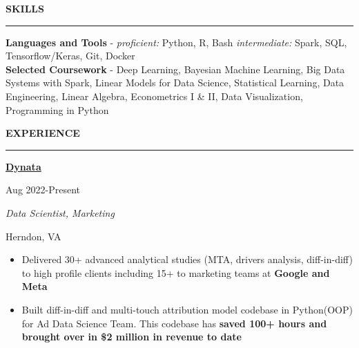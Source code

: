 \documentclass[
  16,
]{article}
\providecommand{\tightlist}{%
  \setlength{\itemsep}{0pt}\setlength{\parskip}{0pt}}\usepackage{longtable,booktabs,array}
\begin{document}
\begin{large}{\bf SKILLS}
  \vspace{3pt}
  \hrule
\end{large}
\vspace{-0.16cm}

\textbf{Languages and Tools} - \emph{proficient:} Python, R, Bash
\emph{intermediate:} Spark, SQL, Tensorflow/Keras, Git, Docker\\
\textbf{Selected Coursework} - Deep Learning, Bayesian Machine Learning,
Big Data Systems with Spark, Linear Models for Data Science, Statistical
Learning, Data Engineering, Linear Algebra, Econometrics I \& II, Data
Visualization, Programming in Python

\begin{large}{\bf EXPERIENCE}
  \vspace{3pt}
  \hrule
  \begin{multicols}{2}
    \begin{flushleft}{\bf \href{https://www.dynata.com/}{Dynata}}\end{flushleft}
    \begin{flushright}Aug 2022-Present\end{flushright}
  \end{multicols}
  \vspace{-0.17cm}
  \begin{multicols}{2}
    \begin{flushleft}\textit{Data Scientist, Marketing}\end{flushleft}
    \begin{flushright}Herndon, VA\end{flushright}\end
  {multicols}
\end{large}
\vspace{-0.16cm}

\begin{itemize}
\tightlist
\item
  Delivered 30+ advanced analytical studies (MTA, drivers analysis,
  diff-in-diff) to high profile clients including 15+ to marketing teams
  at \textbf{Google and Meta}
\item
  Built diff-in-diff and multi-touch attribution model codebase in
  Python(OOP) for Ad Data Science Team. This codebase has \textbf{saved
  100+ hours and brought over in \$2 million in revenue to date}
\end{itemize}

\vspace{7pt}
\end{document}
